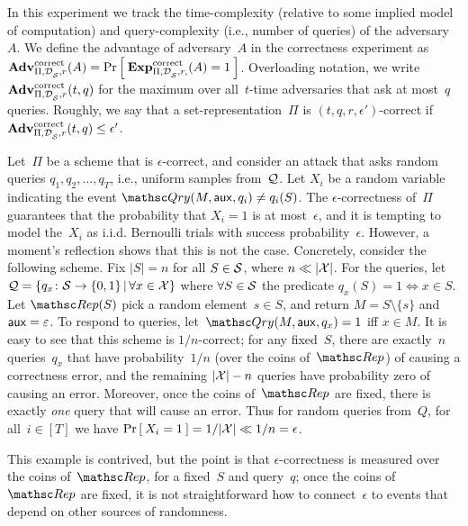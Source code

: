 In this experiment we track the time-complexity (relative to some
implied model of computation) and query-complexity (i.e., number of
queries) of the adversary~$A$.  
We define the advantage of adversary~$A$ in the correctness experiment as 
$\mathrm{\mathbf{Adv}}^{\mathrm{correct}}_{\Pi,\mathcal{D}_{{\cal S}}^{},r}(A) = \Pr\left[\: \mathrm{\mathbf{Exp}}^{\mathrm{correct}}_{\Pi,\mathcal{D}_{{\cal S}}^{}, r,}(A)=1 \:\right]$.
Overloading notation, we write $\mathrm{\mathbf{Adv}}^{\mathrm{correct}}_{\Pi,\mathcal{D}_{{\cal S}}^{},r}(t,q)$ for the maximum over all~$t$-time adversaries that ask at most~$q$ queries. Roughly, we say that a
set-representation~$\Pi$ is $(t,q,r,\epsilon')$-correct if $\mathrm{\mathbf{Adv}}^{\mathrm{correct}}_{\Pi,\mathcal{D}_{{\cal S}}^{},r}(t,q) \leq \epsilon'$.  

\def\bin{{\sf Bin}}
Let~$\Pi$ be a scheme that is $\epsilon$-correct, and consider an attack that 
asks random queries $q_1,q_2,\ldots,q_T$, i.e., uniform samples from~${\cal Q}$.
Let $X_i$ be a random variable indicating the event $\Qry(M,\aux,q_i)\neq q_i(S)$.  
The $\epsilon$-correctness of~$\Pi$ guarantees that the probability that $X_i=1$ is at most~$\epsilon$, 
and it is tempting to model the~$X_i$ as i.i.d. Bernoulli trials with success probability~$\epsilon$.
However, a moment's reflection shows that this is not the case.  Concretely, consider the following scheme.  Fix $|S|=n$ for all $S \in {\cal S}$, where $n \ll |{\cal X}|$.  For the queries, let ${\cal Q} = \{q_x\colon {\cal S} \to \{0,1\} \,|\, \forall x \in {\cal X}\}$ where $\forall S \in {\cal S}$ the predicate $q_x(S)=1 \Leftrightarrow x \in S$.  Let $\Rep(S)$ pick a random element~$s \in S$, and return $M = S \setminus \{s\}$ and ${\sf aux} = \varepsilon$.  To respond to queries, let~$\Qry(M,\aux,q_x)=1$ iff $x \in M$.  It is easy to see that this scheme is $1/n$-correct; for any fixed~$S$, there are exactly~$n$ queries~$q_x$ that have probability~$1/n$  (over the coins of~$\Rep$) of causing a correctness error, and the remaining $|{\cal X}|-n$ queries have probability zero of causing an error.  Moreover, once the coins of~$\Rep$ are fixed, there is exactly \emph{one} query that will cause an error.  Thus for random queries from~$Q$, for all~$i\in[T]$ we have $\Pr\left[\: X_i=1 \:\right]=1/|{\cal X}| \ll 1/n = \epsilon$.

This example is contrived, but the point is that $\epsilon$-correctness is measured over the coins of~$\Rep$, for a fixed~$S$ and query~$q$; once the coins of~$\Rep$ are fixed, it is not straightforward how to connect~$\epsilon$ to events that depend on other sources of randomness. 


